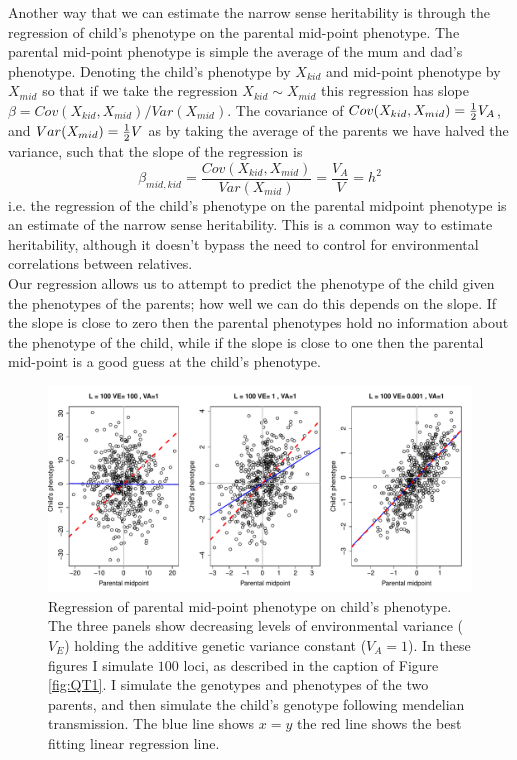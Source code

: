 Another way that we can estimate the narrow sense heritability is
through the regression of child's phenotype on the parental mid-point
phenotype. The parental mid-point phenotype is simple the average of
the mum and dad's phenotype. Denoting the child's phenotype by $X_{kid}$ and mid-point
phenotype by $X_{mid}$ so that if we take the regression $X_{kid} \sim X_{mid}$ this
regression has slope $\beta = Cov(X_{kid},X_{mid})/Var(X_{mid})$.
The covariance of $Cov(X_{kid},X_{mid})=\tfrac{1}{2}
V_A$, and $Var(X_{mid}) = \tfrac{1}{2} V$ as by taking the average of the
parents we have halved the variance, such that the slope of the
regression is
\begin{equation}
\beta_{mid,kid}= \frac{Cov(X_{kid},X_{mid})}{Var(X_{mid})} = \frac{V_A}{V} = h^2
\end{equation}
i.e. the regression of the child's phenotype on the parental midpoint
phenotype is an estimate of the narrow sense heritability. This is a
common way to estimate heritability, although it doesn't bypass the
need to control for environmental correlations between relatives. \\

Our regression allows us to attempt to predict the phenotype of the
child given the phenotypes of the parents; how well we can do this depends on the
slope. If the slope is close to zero then the parental phenotypes hold no
information about the phenotype of the child, while if the slope is
close to one then the parental mid-point is a good guess at the child's
phenotype.\\
\begin{figure}
\begin{center}
\includegraphics[width=\textwidth]{figures/QT2.pdf}
\end{center}
\caption{Regression of parental mid-point phenotype on child's
  phenotype. The three panels show decreasing levels of environmental
  variance ($V_E$) holding the additive genetic variance constant ($V_A=1$). 
 In these figures I simulate $100$ loci, as described in
 the caption of Figure \ref{fig:QT1}. I simulate the genotypes and
 phenotypes of the two parents, and then simulate the child's genotype
following mendelian transmission. The blue line shows $x=y$ the red
line shows the best fitting linear regression line. }
\end{figure}

